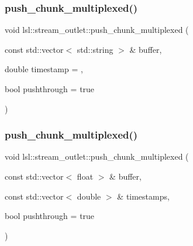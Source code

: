 \subsubsection{\texorpdfstring{push\+\_\+chunk\+\_\+multiplexed()}{push\_chunk\_multiplexed()}\hspace{0.1cm}{\footnotesize\ttfamily [7/28]}}
{\footnotesize\ttfamily void lsl\+::stream\+\_\+outlet\+::push\+\_\+chunk\+\_\+multiplexed (\begin{DoxyParamCaption}\item[{const std\+::vector$<$ std\+::string $>$ \&}]{buffer,  }\item[{double}]{timestamp = {},  }\item[{bool}]{pushthrough = {\ttfamily true} }\end{DoxyParamCaption})\hspace{0.3cm}{\ttfamily [inline]}}

\mbox{\label{classlsl_1_1stream__outlet_a5944abd4386a9568441ddb352e8df71f}} 
\subsubsection{\texorpdfstring{push\+\_\+chunk\+\_\+multiplexed()}{push\_chunk\_multiplexed()}\hspace{0.1cm}{\footnotesize\ttfamily [8/28]}}
{\footnotesize\ttfamily void lsl\+::stream\+\_\+outlet\+::push\+\_\+chunk\+\_\+multiplexed (\begin{DoxyParamCaption}\item[{const std\+::vector$<$ float $>$ \&}]{buffer,  }\item[{const std\+::vector$<$ double $>$ \&}]{timestamps,  }\item[{bool}]{pushthrough = {\ttfamily true} }\end{DoxyParamCaption})\hspace{0.3cm}{\ttfamily [inline]}}

